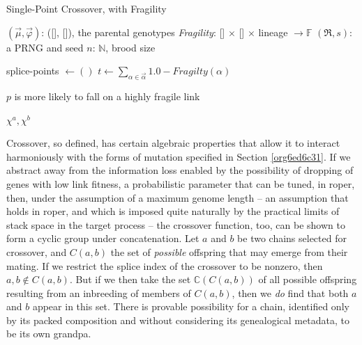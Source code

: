 \documentclass[12pt,glossary]{dalthesis}
\begin{document}
\begin{algorithm}
\caption{Single-Point Crossover, with Fragility} \label{alg:crossover}
\begin{algorithmic}[1]

\REQUIRE $(\vec{\mu}, \vec{\varphi})$: ([\!], [\!]), the parental genotypes 
\REQUIRE \emph{Fragility}: [\!] $\times$ [\!] $\times$ lineage $\to \mathbb{F}$ 
\REQUIRE $(\mathfrak{R}, s)$: a PRNG and seed \REQUIRE $n$: $\mathbb{N}$, brood size


\STATE
{splice-points $\gets ()$}  \FOR {$\vec{\alpha} \in (\vec{\mu }, \vec{\varphi})$} 
\STATE
{$t \gets \sum_{\alpha \in \vec{\alpha}} 1.0 - \textit{Fragilty}(\alpha)$}

 \COMMENT
{$p$ is more likely to fall on a highly fragile link} 

  
 \ENDWHILE 
{} \ENDFOR 
{} 

 \RETURN
{$\chi^a, \chi^b$} 
\end{algorithmic} 
\end{algorithm}

Crossover, so defined, has certain algebraic properties that allow it
to interact harmoniously with the forms of mutation specified in 
Section \ref{org6ed6c31}. If we abstract away from the information loss
enabled by the possibility of dropping of genes with low link fitness, a
probabilistic parameter that can be tuned, in \gls{roper}, then, under the
assumption of a maximum genome length -- an assumption that holds in \gls{roper},
and which is imposed quite naturally by the practical limits of stack space in
the target process -- the crossover function, too, can be shown to form a cyclic group
under concatenation. Let \(a\) and \(b\) be two chains selected for crossover, and 
\(C(a,b)\) the set of \emph{possible} offspring that may emerge from their mating. If
we restrict the splice index of the crossover to be nonzero, then \(a,b \not \in C(a,b)\).
But if we then take the set \(\mathbb{C}(C(a,b))\) of all possible offspring resulting
from an inbreeding of members of \(C(a,b)\), then we \emph{do} find that both \(a\) and \(b\)
appear in this set. There is provable possibility for a chain, identified only by
its packed composition and without considering its genealogical metadata, to be its
own grandpa. 
\end{document}
